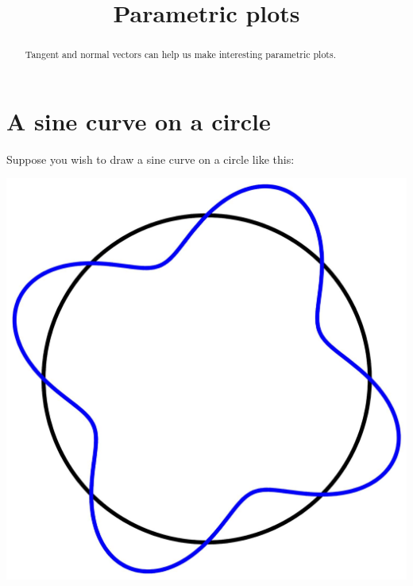 \documentclass{ximera}
\title[Dig-In:]{Parametric plots}
\begin{document}
\begin{abstract}
  Tangent and normal vectors can help us make interesting parametric
  plots.
\end{abstract}
\maketitle

\section{A sine curve on a circle}

Suppose you wish to draw a sine curve on a circle like this:
\begin{image}
  \includegraphics{sinOnCircle.jpg}
\end{image}
\end{document}
